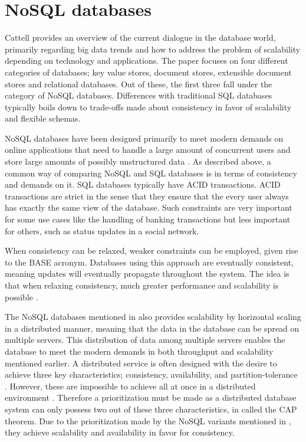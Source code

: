 \section{NoSQL databases}
Cattell \cite{Catell} provides an overview of the current dialogue in the database world, primarily regarding big data trends and how to address the problem of scalability depending on technology and applications. The paper focuses on four different categories of databases; key value stores, document stores, extensible document stores and relational databases. Out of these, the first three fall under the category of NoSQL databases. Differences with traditional SQL databases typically boils down to trade-offs made about consistency in favor of scalability and flexible schemas. 

NoSQL databases have been designed primarily to meet modern demands on online applications that need to handle a large amount of concurrent users and store large amounts of possibly unstructured data \cite{Catell}.
As described above, a common way of comparing NoSQL and SQL databases is in terms of consistency and demands on it. SQL databases typically have ACID \cite{Mullins} transactions. ACID transactions are strict in the sense that they ensure that the every user always has exactly the same view of the database. Such constraints are very important for some use cases like the handling of banking transactions but less important for others, such as status updates in a social network.

When consistency can be relaxed, weaker constraints can be employed, given rise to the BASE \cite{Catell} acronym. Databases using this approach are eventually consistent, meaning updates will eventually propagate throughout the system. The idea is that when relaxing consistency, much greater performance and scalability is possible \cite{Catell}.

The NoSQL databases mentioned in \cite{Catell} also provides scalability by horizontal scaling in a distributed manner, meaning that the data in the database can be spread on multiple servers. This distribution of data among multiple servers enables the database to meet the modern demands in both throughput and scalability \cite{Abadi} mentioned earlier. A distributed service is often designed with the desire to achieve three key characteristics; consistency, availability, and partition-tolerance \cite{Brewer}. However, these are impossible to achieve all at once in a distributed environment \cite{Brewer}. Therefore a prioritization must be made as a distributed database system can only possess two out of these three characteristics, in \cite{Brewer} called the CAP theorem. Due to the prioritization made by the NoSQL variants mentioned in \cite{Catell}, they achieve scalability and availability in favor for consistency. 

